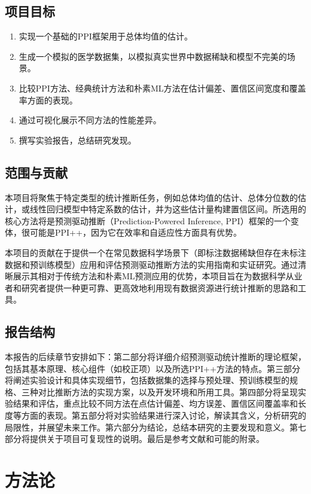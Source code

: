 \documentclass[12pt,a4paper]{article}
\begin{document}
\subsection{项目目标}
\begin{enumerate}
    \item 实现一个基础的PPI框架用于总体均值的估计。
    \item 生成一个模拟的医学数据集，以模拟真实世界中数据稀缺和模型不完美的场景。
    \item 比较PPI方法、经典统计方法和朴素ML方法在估计偏差、置信区间宽度和覆盖率方面的表现。
    \item 通过可视化展示不同方法的性能差异。
    \item 撰写实验报告，总结研究发现。
\end{enumerate}

\subsection{范围与贡献}
\label{sec:scope_contribution}
本项目将聚焦于特定类型的统计推断任务，例如总体均值的估计、总体分位数的估计，或线性回归模型中特定系数的估计，并为这些估计量构建置信区间。所选用的核心方法将是预测驱动推断（Prediction-Powered Inference, PPI）框架的一个变体，很可能是PPI++，因为它在效率和自适应性方面具有优势。

本项目的贡献在于提供一个在常见数据科学场景下（即标注数据稀缺但存在未标注数据和预训练模型）应用和评估预测驱动推断方法的实用指南和实证研究。通过清晰展示其相对于传统方法和朴素ML预测应用的优势，本项目旨在为数据科学从业者和研究者提供一种更可靠、更高效地利用现有数据资源进行统计推断的思路和工具。

\subsection{报告结构}
\label{sec:report_structure}
本报告的后续章节安排如下：第二部分将详细介绍预测驱动统计推断的理论框架，包括其基本原理、核心组件（如校正项）以及所选PPI++方法的特点。第三部分将阐述实验设计和具体实现细节，包括数据集的选择与预处理、预训练模型的规格、三种对比推断方法的实现方案，以及开发环境和所用工具。第四部分将呈现实验结果和评估，重点比较不同方法在点估计偏差、均方误差、置信区间覆盖率和长度等方面的表现。第五部分将对实验结果进行深入讨论，解读其含义，分析研究的局限性，并展望未来工作。第六部分为结论，总结本研究的主要发现和意义。第七部分将提供关于项目可复现性的说明。最后是参考文献和可能的附录。

\section{方法论}
\label{sec:methodology}
\end{document}
